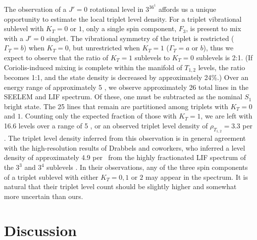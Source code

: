 The observation of a $J'=0$ rotational level in $3^36^1$ 
affords us a unique opportunity to estimate the local triplet level
density.  For a triplet vibrational sublevel with $K_T=0$ or $1$, only
a single spin component, $F_3$, is present to mix with a $J'=0$
singlet.  The vibrational symmetry of the triplet is restricted
($\Gamma_T=b$) when $K_T=0$, but unrestricted when $K_T=1$
($\Gamma_T=a$ or $b$), thus we expect to observe that the ratio of
$K_T=1$ sublevels to $K_T=0$ sublevels is 2:1.  (If Coriolis-induced
mixing is complete within the manifold of $T_{1,2}$ levels, the ratio
becomes 1:1, and the state density is decreased by approximately
24\%.)  Over an energy range of approximately 5 \rcm, we observe
approximately 26 total lines in the SEELEM and LIF spectrum.  Of
these, one must be subtracted as the nominal $S_1$ bright state.  The
25 lines that remain are partitioned among triplets with $K_T=0$ and
$1$.  Counting only the expected fraction of those with $K_T=1$, we
are left with 16.6 levels over a range of 5 \rcm, or an observed
triplet level density of $\rho_{T_{1,2}} = 3.3$ per \rcm.  The triplet
level density inferred from this observation is in general agreement
with the high-resolution results of Drabbels and coworkers, who
inferred a level density of approximately 4.9 per \rcm\ from the
highly fractionated LIF spectrum of the $3^3$  and $3^4$ 
sublevels \cite{drabbels94}.  In their observations, any of the three
spin components of a triplet sublevel with either $K_T=0, 1$ or $2$
may appear in the spectrum.  It is natural that their triplet level
count should be slightly higher and somewhat more uncertain than ours.




















\section{Discussion}

